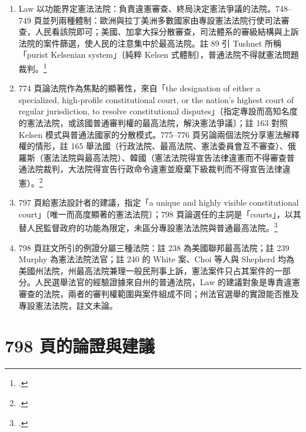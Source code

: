 \begin{enumerate}
\tightlist
\item
  Law 以功能界定憲法法院：負責違憲審查、終局決定憲法爭議的法院。748--749 頁並列兩種體制：歐洲與拉丁美洲多數國家由專設憲法法院行使司法審查，人民看該院即可；美國、加拿大採分散審查，司法體系的審級結構與上訴法院的案件篩選，使人民的注意集中於最高法院。註 89 引 Tushnet 所稱「purist Kelsenian system」〔純粹 Kelsen 式體制〕，普通法院不得就憲法問題裁判。\footcite[748--749 \& n.89]{law2009}
\item
  774 頁論法院作為焦點的顯著性，來自「the designation of either a specialized, high-profile constitutional court, or the nation's highest court of regular jurisdiction, to resolve constitutional disputes」〔指定專設而高知名度的憲法法院，或該國普通審判權的最高法院，解決憲法爭議〕；註 163 對照 Kelsen 模式與普通法國家的分散模式。775--776 頁另論兩個法院分享憲法解釋權的情形，註 165 舉法國（行政法院、最高法院、憲法委員會互不審查）、俄羅斯（憲法法院與最高法院）、韓國（憲法法院得宣告法律違憲而不得審查普通法院裁判，大法院得宣告行政命令違憲並廢棄下級裁判而不得宣告法律違憲）。\footcite[774--776 \& nn.163, 165]{law2009}
\item
  797 頁給憲法設計者的建議，指定「a unique and highly visible constitutional court」〔唯一而高度顯著的憲法法院〕；798 頁論選任的主詞是「courts」，以其替人民監督政府的功能為限定，未區分專設憲法法院與普通最高法院。\footcite[797--798]{law2009}
\item
  798 頁註文所引的例證分屬三種法院：註 238 為美國聯邦最高法院；註 239 Murphy 為憲法法院法官；註 240 的 White 案、Choi 等人與 Shepherd 均為美國州法院，州最高法院兼理一般民刑事上訴，憲法案件只占其案件的一部分。人民選舉法官的經驗證據來自州的普通法院，Law 的建議對象是專責違憲審查的法院，兩者的審判權範圍與案件組成不同；州法官選舉的實證能否推及專設憲法法院，註文未論。
\end{enumerate}

\section{798 頁的論證與建議}
\label{sec:40_selection-2}

